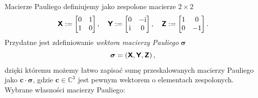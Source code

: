 \documentclass{myclass}
\begin{document}
Macierze Pauliego definiujemy jako zespolone macierze \(2\times 2\)
\begin{equation*}
    \oper{X} := \mqty[0 & 1 \\ 1 & 0]\,,\quad \oper{Y} := \mqty[0 & -\im \\ \im & 0]\,,\quad \oper{Z} := \mqty[1 & 0 \\ 0 & -1]\,.
\end{equation*}
Przydatne jest zdefiniowanie \textit{wektora macierzy Pauliego} \(\boldsymbol{\sigma}\)
\begin{equation*}
    \boldsymbol{\sigma} = (\boldsymbol{\mathsf{X}}, \boldsymbol{\mathsf{Y}}, \boldsymbol{\mathsf{Z}})\,,
\end{equation*}
dzięki któremu możemy łatwo zapisać sumę przeskalowanych macierzy Pauliego jako
\(\mathbf{c}\cdot\boldsymbol{\sigma}\), gdzie \(\mathbf{c}\in\mathbb{C}^3\) jest pewnym wektorem o
elementach zespolonych. Wybrane własności macierzy Pauliego:
\end{document}
